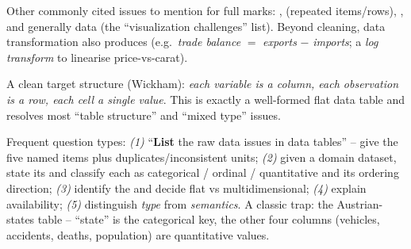 Other commonly cited issues to mention for full marks: ,
 (repeated items/rows), , and
generally  data (the
``visualization challenges'' list). Beyond cleaning, data transformation also
produces  (e.g.\ \emph{trade balance} $=$ \emph{exports} $-$
\emph{imports}; a \emph{log transform} to linearise price-vs-carat).

\begin{keybox}
A clean target structure (Wickham): \emph{each variable is a column, each
observation is a row, each cell a single value}. This is exactly a well-formed
flat data table and resolves most ``table structure'' and ``mixed type'' issues.
\end{keybox}

\begin{exambox}
Frequent question types: \emph{(1)} ``\textbf{List} the raw data issues in data
tables'' -- give the five named items plus duplicates/inconsistent units;
\emph{(2)} given a domain dataset, state its  and classify each
 as categorical / ordinal / quantitative and its ordering
direction; \emph{(3)} identify the  and decide flat vs
multidimensional; \emph{(4)} explain  availability;
\emph{(5)} distinguish \emph{type} from \emph{semantics}. A classic trap: the
Austrian-states table -- ``state'' is the categorical key, the other four columns
(vehicles, accidents, deaths, population) are quantitative values.
\end{exambox}
